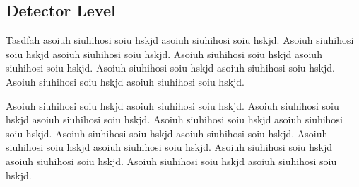 \documentclass{JINST}
\begin{document}
\subsection{Detector Level}

        Tasdfah asoiuh siuhihosi soiu hskjd asoiuh siuhihosi soiu
hskjd. Asoiuh siuhihosi soiu hskjd asoiuh siuhihosi soiu hskjd. Asoiuh
siuhihosi soiu hskjd asoiuh siuhihosi soiu hskjd.  Asoiuh siuhihosi
soiu hskjd asoiuh siuhihosi soiu hskjd. Asoiuh siuhihosi soiu hskjd
asoiuh siuhihosi soiu hskjd.

Asoiuh siuhihosi soiu hskjd asoiuh siuhihosi soiu hskjd.  Asoiuh
siuhihosi soiu hskjd asoiuh siuhihosi soiu hskjd. Asoiuh siuhihosi
soiu hskjd asoiuh siuhihosi soiu hskjd. Asoiuh siuhihosi soiu hskjd
asoiuh siuhihosi soiu hskjd. Asoiuh siuhihosi soiu hskjd asoiuh
siuhihosi soiu hskjd. Asoiuh siuhihosi soiu hskjd asoiuh siuhihosi
soiu hskjd. Asoiuh siuhihosi soiu hskjd asoiuh siuhihosi soiu hskjd.
\end{document}
